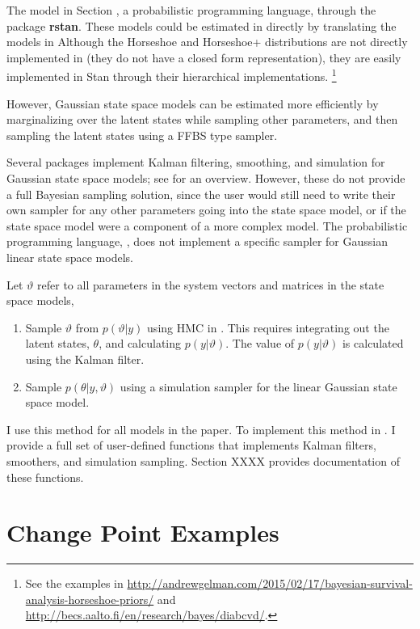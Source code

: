 The model in Section \Stan{}, a probabilistic programming language, through the \R{} package \textbf{rstan}.
These models could be estimated in \Stan{} directly by translating the models in 
Although the Horseshoe and Horseshoe+ distributions are not directly implemented in \Stan{} (they do not have a closed form representation), they are easily implemented in Stan through their hierarchical implementations.%
\footnote{See the examples in \url{http://andrewgelman.com/2015/02/17/bayesian-survival-analysis-horseshoe-priors/} and \url{http://becs.aalto.fi/en/research/bayes/diabcvd/}.}

However, Gaussian state space models can be estimated more efficiently by marginalizing over the latent states while sampling other parameters, and then sampling the latent states using a FFBS type sampler.

Several \R{} packages implement Kalman filtering, smoothing, and simulation for Gaussian state space models; see \textcite{Tusell2011} for an overview.
However, these do not provide a full Bayesian sampling solution, since the user would still need to write their own sampler for any other parameters going into the state space model, or if the state space model were a component of a more complex model.
The  probabilistic programming language, , does not implement a specific sampler for Gaussian linear state space models.

Let $\vartheta$ refer to all parameters in the system vectors and matrices in the state space models,
\begin{enumerate}
\item Sample $\vartheta$ from $p(\vartheta | y)$ using HMC in \Stan{}.
  This requires integrating out the latent states, $\theta$, and calculating $p(y | \vartheta)$.
  The value of $p(y | \vartheta)$ is calculated using the Kalman filter.
\item Sample $p(\theta | y, \vartheta)$ using a simulation sampler for the linear Gaussian state space model.
\end{enumerate}
I use this method for all models in the paper. 
To implement this method in \Stan{}.
I provide a full set of user-defined \Stan{} functions that implements Kalman filters, smoothers, and simulation sampling.
Section XXXX provides documentation of these functions.



\section{Change Point Examples}
\label{dlm:sec:examples}



